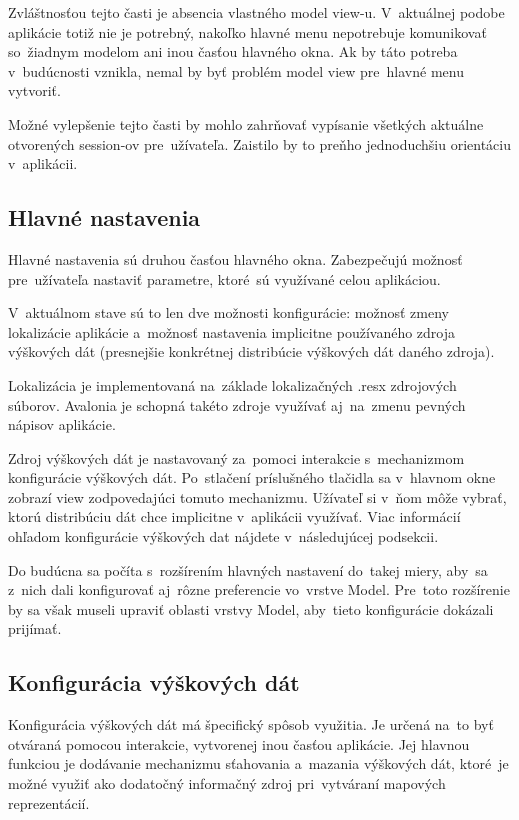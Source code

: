 Zvláštnosťou tejto časti je absencia vlastného model view-u. V~aktuálnej podobe aplikácie totiž nie je potrebný, nakoľko hlavné menu nepotrebuje komunikovať so~žiadnym modelom ani inou časťou hlavného okna. Ak by táto potreba v~budúcnosti vznikla, nemal by byť problém model view pre~hlavné menu vytvoriť. 

Možné vylepšenie tejto časti by mohlo zahrňovať vypísanie všetkých aktuálne otvorených session-ov pre~užívateľa. Zaistilo by to preňho jednoduchšiu orientáciu v~aplikácii.

\subsection{Hlavné nastavenia}

Hlavné nastavenia sú druhou časťou hlavného okna. Zabezpečujú možnosť pre~užívateľa nastaviť parametre, ktoré~sú využívané celou aplikáciou. 

V~aktuálnom stave sú to len dve možnosti konfigurácie: možnosť zmeny lokalizácie aplikácie a~možnosť nastavenia implicitne používaného zdroja výškových dát (presnejšie konkrétnej distribúcie výškových dát daného zdroja). 

Lokalizácia je implementovaná na~základe lokalizačných .resx zdrojových súborov. Avalonia je schopná takéto zdroje využívať aj~na~zmenu pevných nápisov aplikácie. %

Zdroj výškových dát je nastavovaný za~pomoci interakcie s~mechanizmom konfigurácie výškových dát. Po~stlačení príslušného tlačidla sa v~hlavnom okne zobrazí view zodpovedajúci tomuto mechanizmu. Užívateľ si v~ňom môže vybrať, ktorú distribúciu dát chce implicitne v~aplikácii využívať. Viac informácií ohľadom konfigurácie výškových dat nájdete v~následujúcej podsekcii.

Do budúcna sa počíta s~rozšírením hlavných nastavení do~takej miery, aby~sa z~nich dali konfigurovať aj~rôzne preferencie vo~vrstve Model. Pre~toto rozšírenie by sa však museli upraviť oblasti vrstvy Model, aby~tieto konfigurácie dokázali prijímať.

\subsection{Konfigurácia výškových dát}\label{konfiguracia_vyskovych_dat}

Konfigurácia výškových dát má špecifický spôsob využitia. Je určená na~to byť otváraná pomocou interakcie, vytvorenej inou časťou aplikácie. Jej hlavnou funkciou je dodávanie mechanizmu sťahovania a~mazania výškových dát, ktoré~je možné využiť ako dodatočný informačný zdroj pri~vytváraní mapových reprezentácií. 

